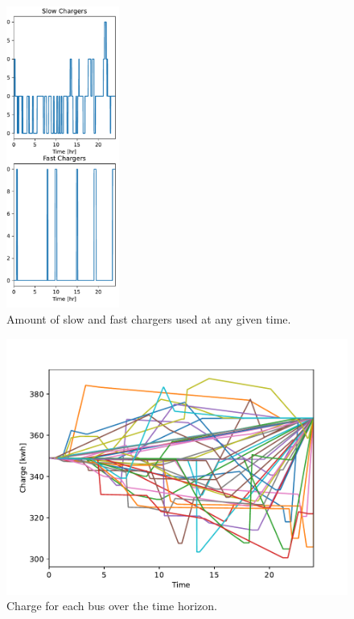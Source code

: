 \documentclass[letterpaper, 10pt, conference]{IEEEtran}
\begin{document}
\begin{figure}[ht]
	\centering
	\includegraphics[trim=0in 0.25in 0in 0.75in, width=0.75\linewidth, height=3.9in]{usage.pdf}
	\caption{Amount of slow and fast chargers used at any given time.}
	\label{fig:usage}
\end{figure}

\begin{figure}
	\centering
	\includegraphics[trim= 0in 0in 0in 0.25in, width=\linewidth]{charges.pdf}
	\caption{Charge for each bus over the time horizon.}
	\label{fig:charges}
\end{figure}

\end{document}

